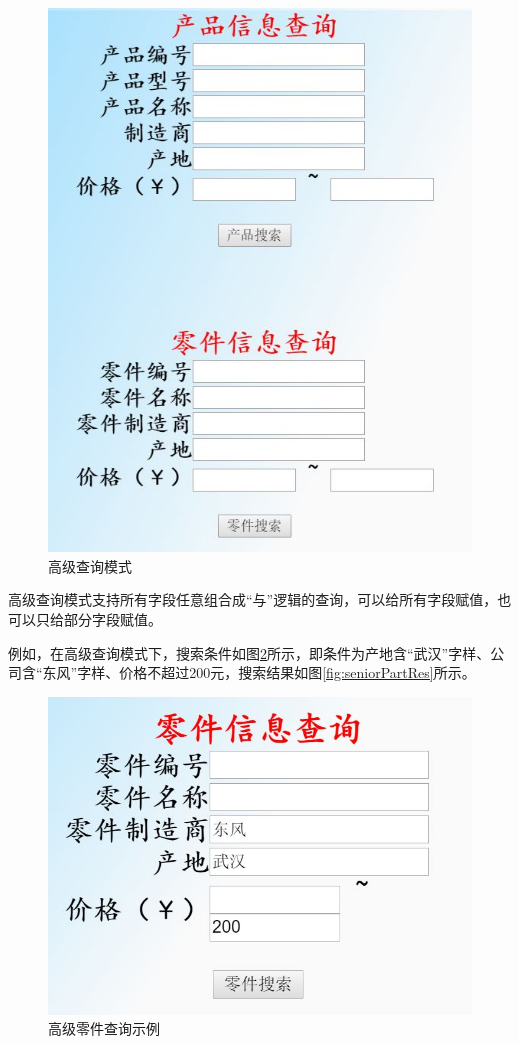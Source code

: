 \begin{figure}[H]
\centering
\includegraphics[width=0.7\linewidth]{figure/seniorSear}
\caption{高级查询模式}
\label{fig:seniorSear}
\end{figure}

高级查询模式支持所有字段任意组合成``与''逻辑的查询，可以给所有字段赋值，也可以只给部分字段赋值。

例如，在高级查询模式下，搜索条件如图\ref{fig:seniorPartSea}所示，即条件为产地含``武汉''字样、公司含``东风''字样、价格不超过200元，搜索结果如图\ref{fig:seniorPartRes}所示。

\begin{figure}[H]
\centering
\includegraphics[width=0.7\linewidth]{figure/seniorPartSea}
\caption{高级零件查询示例}
\label{fig:seniorPartSea}
\end{figure}

